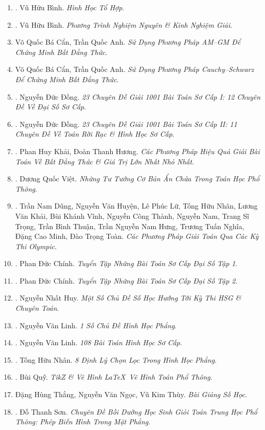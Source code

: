 \documentclass{article}
\begin{document}
\begin{enumerate}
	\item \cite{Binh_HHTH}. Vũ Hữu Bình. {\it Hình Học Tổ Hợp}.\hfill{\sf[reading]}
	\item \cite{Binh_PTNN}. Vũ Hữu Bình. {\it Phương Trình Nghiệm Nguyên \& Kinh Nghiệm Giải}.\hfill{\sf[reading]}
	\item Võ Quốc Bá Cẩn, Trần Quốc Anh. {\it Sử Dụng Phương Pháp AM--GM Để Chứng Minh Bất Đẳng Thức}.
	\item Võ Quốc Bá Cẩn, Trần Quốc Anh. {\it Sử Dụng Phương Pháp Cauchy--Schwarz Để Chứng Minh Bất Đẳng Thức}.
	\item \cite{Dong_23_1001_toan_I}. Nguyễn Đức Đồng. {\it 23 Chuyên Đề Giải 1001 Bài Toán Sơ Cấp I: 12 Chuyên Đề Về Đại Số Sơ Cấp}.\hfill{\sf[reading]}
	\item \cite{Dong_23_1001_toan_II}. Nguyễn Đức Đồng. {\it 23 Chuyên Đề Giải 1001 Bài Toán Sơ Cấp II: 11 Chuyên Đề Về Toán Rời Rạc \& Hình Học Sơ Cấp}.\hfill{\sf[reading]}
	\item \cite{Khai_Huong_bdt}. Phan Huy Khải, Đoàn Thanh Hương. {\it Các Phương Pháp Hiệu Quả Giải Bài Toán Về Bất Đẳng Thức \& Giá Trị Lớn Nhất Nhỏ Nhất}.\hfill{\sf[reading]}
	\item \cite{Viet2014}. Dương Quốc Việt. {\it Những Tư Tưởng Cơ Bản Ẩn Chứa Trong Toán Học Phổ Thông}.\hfill{\sf[done]}
	\item \cite{Dung_cac_phuong_phap_giai_toan_qua_cac_ky_thi_olympic_2022}. Trần Nam Dũng, Nguyễn Văn Huyện, Lê Phúc Lữ, Tống Hữu Nhân, Lương Văn Khải, Bùi Khánh Vĩnh, Nguyễn Công Thành, Nguyễn Nam, Trang Sĩ Trọng, Trần Bình Thuận, Trần Nguyễn Nam Hưng, Trương Tuấn Nghĩa, Đặng Cao Minh, Đào Trọng Toàn. {\it Các Phương Pháp Giải Toán Qua Các Kỳ Thi Olympic}.\hfill{\sf[reading]}
	\item \cite{Chinh2021_tap_1}. Phan Đức Chính. {\it Tuyển Tập Những Bài Toán Sơ Cấp Đại Số Tập 1}.\hfill{\sf[reading]}
	\item \cite{Chinh2021_tap_2}. Phan Đức Chính. {\it Tuyển Tập Những Bài Toán Sơ Cấp Đại Số Tập 2}.\hfill{\sf[reading]}
	\item \cite{Huy_so_hoc}. Nguyễn Nhất Huy. {\it Một Số Chủ Đề Số Học Hướng Tới Kỳ Thi HSG \& Chuyên Toán}.\hfill{\sf[reading]}
	\item \cite{Linh_topic_geometry}. Nguyễn Văn Linh. {\it 1 Số Chủ Đề Hình Học Phẳng}.\hfill{\sf[reading]}
	\item \cite{Linh_108_geometry}. Nguyễn Văn Linh. {\it 108 Bài Toán Hình Học Sơ Cấp}.\hfill{\sf[reading]}
	\item \cite{Nhan_8_geometry_theorem}. Tống Hữu Nhân. {\it 8 Định Lý Chọn Lọc Trong Hình Học Phẳng}.\hfill{\sf[reading]}
	\item \cite{Quy2022}. Bùi Quỹ. {\it TikZ \& Vẽ Hình \LaTeX\ Vẽ Hình Toán Phổ Thông}.\hfill{\sf[reading]}
	\item Đặng Hùng Thắng, Nguyễn Văn Ngọc, Vũ Kim Thùy. {\it Bài Giảng Số Học}.
	\item \cite{Son2006}. Đỗ Thanh Sơn. {\it Chuyên Đề Bồi Dưỡng Học Sinh Giỏi Toán Trung Học Phổ Thông: Phép Biến Hình Trong Mặt Phẳng}.\hfill{\sf[reading]}	
\end{enumerate}
\end{document}
